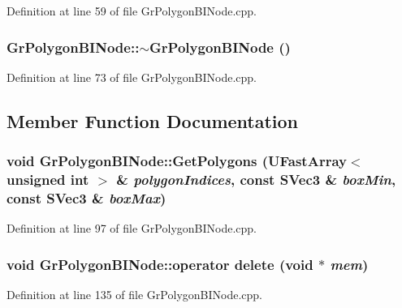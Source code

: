 \begin{CompactItemize}
Definition at line 59 of file GrPolygonBINode.cpp.\hypertarget{class_gr_polygon_b_i_node_18ea1e3d6112a3aa526d399b6abe3ba5}{
\subsubsection[{$\sim$GrPolygonBINode}]{\setlength{\rightskip}{0pt plus 5cm}GrPolygonBINode::$\sim$GrPolygonBINode ()}}
\label{class_gr_polygon_b_i_node_18ea1e3d6112a3aa526d399b6abe3ba5}




Definition at line 73 of file GrPolygonBINode.cpp.

\subsection{Member Function Documentation}
\hypertarget{class_gr_polygon_b_i_node_c85fa5cabd12d49fd10362ec7896a129}{
\subsubsection[{GetPolygons}]{\setlength{\rightskip}{0pt plus 5cm}void GrPolygonBINode::GetPolygons ({\bf UFastArray}$<$ unsigned int $>$ \& {\em polygonIndices}, \/  const {\bf SVec3} \& {\em boxMin}, \/  const {\bf SVec3} \& {\em boxMax})}}
\label{class_gr_polygon_b_i_node_c85fa5cabd12d49fd10362ec7896a129}




Definition at line 97 of file GrPolygonBINode.cpp.\hypertarget{class_gr_polygon_b_i_node_52c6bb5186eba8c6ef16dbb3a3eafd82}{
\subsubsection[{operator delete}]{\setlength{\rightskip}{0pt plus 5cm}void GrPolygonBINode::operator delete (void $\ast$ {\em mem})}}
\label{class_gr_polygon_b_i_node_52c6bb5186eba8c6ef16dbb3a3eafd82}




Definition at line 135 of file GrPolygonBINode.cpp.\hypertarget{class_gr_polygon_b_i_node_b27187f2d02d3fe410427168c836f3de}{
}
\end{CompactItemize}
